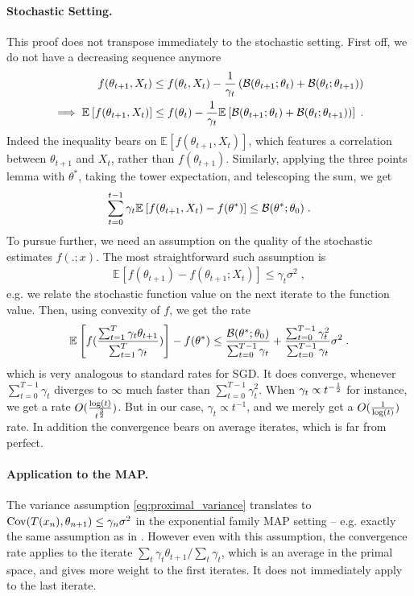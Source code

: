 \documentclass{article}
\newcommand*{\expect}[2][]{\ensuremath{\mathbb{E}_{#1} \left[ #2 \right] }} %
\newcommand{\natp}{\theta}
\newcommand{\lr}{\gamma} %
\begin{document}
\paragraph{Stochastic Setting.}
This proof does not transpose immediately to the stochastic setting.
First off, we do not have a decreasing sequence anymore
\begin{align}
	f(\natp_{t+1}, X_t)  \leq f(\natp_{t}, X_t)  
	- \inv{\lr_t}\left (\cB(\natp_{t+1} ; \natp_{t}) + \cB(\natp_{t} ; \natp_{t+1}) \right) \\
	\implies \expect{f(\natp_{t+1}, X_t)} \leq f(\natp_{t}) 
	- \inv{\lr_t}\expect{\cB(\natp_{t+1} ; \natp_{t}) + \cB(\natp_{t} ; \natp_{t+1}))}  \; .
\end{align}
Indeed the inequality bears on $\expect{f(\natp_{t+1}, X_t)}$, which features a correlation between $\natp_{t+1}$ and $X_t$, rather than $f(\natp_{t+1})$.
Similarly, applying the three points lemma with $\natp^*$, taking the tower expectation, and telescoping the sum, we get
\begin{align}
	\sum_{t=0}^{t-1} \lr_t \expect{f(\natp_{t+1},X_t) - f(\natp^*)}
	\leq \cB( \natp^*; \natp_{0})  \; .
\end{align}
To pursue further, we need an assumption on the quality of the stochastic estimates $f(. ; x)$. 
The most straightforward such assumption is 
\begin{align}
\expect{f(\natp_{t+1}) - f(\natp_{t+1} ; X_{t})} \leq \lr_t \sigma^2 \; ,
\label{eq:proximal_variance}
\end{align}
e.g. we relate the stochastic function value on the next iterate to the function value.
Then, using convexity of $f$, we get the rate
\begin{align}
	 \expect{f(\frac{\sum_{t=1}^{T} \lr_t \natp_{t+1}}{\sum_{t=1}^{T} \lr_t } )} - f(\natp^*)
	\leq \frac{\cB( \natp^*; \natp_{0}) }{\sum_{t=0}^{T-1} \lr_t}
	+ \frac{\sum_{t=0}^{T-1} \lr_t^2  }{\sum_{t=0}^{T-1} \lr_t} \sigma^2 \; .
\end{align}
which is very analogous to standard rates for SGD.
It does converge, whenever $\sum_{t=0}^{T-1} \lr_t$ diverges to $\infty$ much faster than $\sum_{t=0}^{T-1} \lr_t^2$.
When $\lr_t \propto t^{-\half}$ for instance, we get a rate $O(\frac{\log(t)}{t^{\half[3]}})$.
But in our case, $\lr_t \propto t^{-1}$, and we merely get a $O(\inv{\log(t)})$ rate.
In addition the convergence bears on average iterates, which is far from perfect.

\paragraph{Application to the MAP.}
The variance assumption \eqref{eq:proximal_variance} translates to $\Cov(T(x_{n}) , \natp_{n+1}) \leq  \gamma_n \sigma^2$ in the exponential family MAP setting -- e.g. exactly the same assumption as in \citet{hanzely2018fastest}. However even with this assumption, the convergence rate applies to the iterate $\sum_t \lr_t \natp_{t+1} / \sum_t \lr_t$, which is an average in the primal space, and gives more weight to the first iterates. It does not immediately apply to the last iterate.
\end{document}
